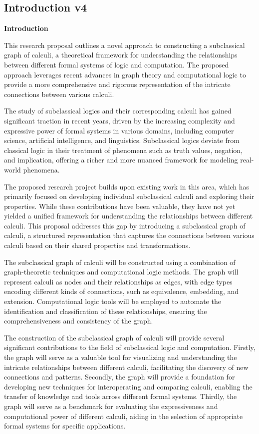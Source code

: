 \hypertarget{introduction-v4}{%
\subsection{Introduction v4}\label{introduction-v4}}

\textbf{Introduction}

This research proposal outlines a novel approach to constructing a
subclassical graph of calculi, a theoretical framework for understanding
the relationships between different formal systems of logic and
computation. The proposed approach leverages recent advances in graph
theory and computational logic to provide a more comprehensive and
rigorous representation of the intricate connections between various
calculi.

The study of subclassical logics and their corresponding calculi has
gained significant traction in recent years, driven by the increasing
complexity and expressive power of formal systems in various domains,
including computer science, artificial intelligence, and linguistics.
Subclassical logics deviate from classical logic in their treatment of
phenomena such as truth values, negation, and implication, offering a
richer and more nuanced framework for modeling real-world phenomena.

The proposed research project builds upon existing work in this area,
which has primarily focused on developing individual subclassical
calculi and exploring their properties. While these contributions have
been valuable, they have not yet yielded a unified framework for
understanding the relationships between different calculi. This proposal
addresses this gap by introducing a subclassical graph of calculi, a
structured representation that captures the connections between various
calculi based on their shared properties and transformations.

The subclassical graph of calculi will be constructed using a
combination of graph-theoretic techniques and computational logic
methods. The graph will represent calculi as nodes and their
relationships as edges, with edge types encoding different kinds of
connections, such as equivalence, embedding, and extension.
Computational logic tools will be employed to automate the
identification and classification of these relationships, ensuring the
comprehensiveness and consistency of the graph.

The construction of the subclassical graph of calculi will provide
several significant contributions to the field of subclassical logic and
computation. Firstly, the graph will serve as a valuable tool for
visualizing and understanding the intricate relationships between
different calculi, facilitating the discovery of new connections and
patterns. Secondly, the graph will provide a foundation for developing
new techniques for interoperating and comparing calculi, enabling the
transfer of knowledge and tools across different formal systems.
Thirdly, the graph will serve as a benchmark for evaluating the
expressiveness and computational power of different calculi, aiding in
the selection of appropriate formal systems for specific applications.

